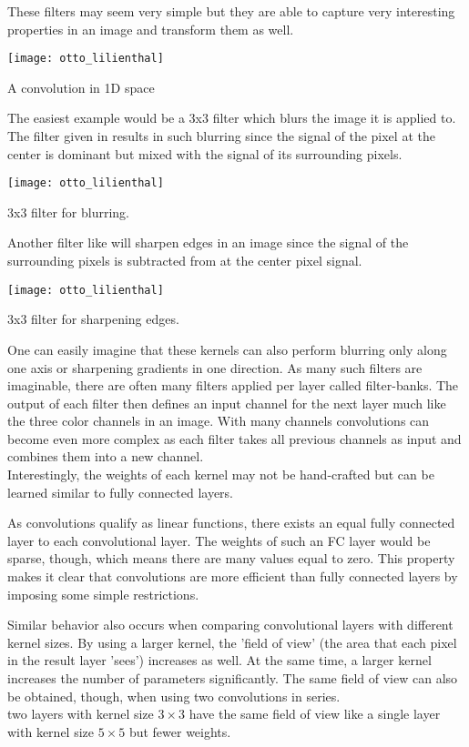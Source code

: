 These filters may seem very simple but they are able to capture very interesting properties in an image and transform them as well.
\begin{marginfigure}
    \texttt{[image: otto\_lilienthal]}
    \caption[]{A convolution in 1D space}
\end{marginfigure}
The easiest example would be a 3x3 filter which blurs the image it is applied to.
The filter given in  results in such blurring since the signal of the pixel at the center is dominant but mixed with the signal of its surrounding pixels.
\begin{marginfigure}
    \texttt{[image: otto\_lilienthal]}
    \caption[]{3x3 filter for blurring.}
\end{marginfigure}

Another filter like  will sharpen edges in an image since the signal of the surrounding pixels is subtracted from at the center pixel signal. 
\begin{marginfigure}
    \texttt{[image: otto\_lilienthal]}
    \caption[]{3x3 filter for sharpening edges.}
\end{marginfigure}

One can easily imagine that these kernels can also perform blurring only along one axis or sharpening gradients in one direction.
As many such filters are imaginable, there are often many filters applied per layer called filter-banks.
The output of each filter then defines an input channel for the next layer much like the three color channels in an image.
With many channels convolutions can become even more complex as each filter takes all previous channels as input and combines them into a new channel.\\
Interestingly, the weights of each kernel may not be hand-crafted but can be learned similar to fully connected layers.

As convolutions qualify as linear functions, there exists an equal fully connected layer to each convolutional layer.
The weights of such an FC layer would be sparse, though, which means there are many values equal to zero.
This property makes it clear that convolutions are more efficient than fully connected layers by imposing some simple restrictions.

Similar behavior also occurs when comparing convolutional layers with different kernel sizes.
By using a larger kernel, the 'field of view' (the area that each pixel in the result layer 'sees') increases as well.
At the same time, a larger kernel increases the number of parameters significantly.
The same field of view can also be obtained, though, when using two convolutions in series.\\
\eg two layers with kernel size $3 \times 3$ have the same field of view like a single layer with kernel size $5 \times 5$ but fewer weights.

